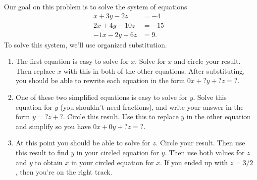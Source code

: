 \begin{problem}
Our goal on this problem is to solve the system of equations 
\begin{align*}
x+3y-2z&=-4 \\
2x+4y-10z&=-15\\
-1x-2y+6z&=9. 
\end{align*}
To solve this system, we'll use organized substitution. 
\begin{enumerate}
 \item The first equation is easy to solve for $x$. Solve for $x$ and circle your result. Then replace $x$ with this in both of the other equations. After substituting, you should be able to rewrite each equation in the form $0x+?y+?z=?$.
 \item One of these two simplified equations is easy to solve for $y$.  Solve this equation for $y$ (you shouldn't need fractions), and write your answer in the form $y=?z+?$. Circle this result.  Use this to replace $y$ in the other equation and simplify so you have $0x+0y+?z=?$. 
 \item At this point you should be able to solve for $z$. Circle your result.  Then use this result to find $y$ in your circled equation for $y$.  Then use both values for $z$ and $y$ to obtain $x$ in your circled equation for $x$.   If you ended up with $z=3/2$, then you're on the right track. 
\end{enumerate}
\end{problem}



